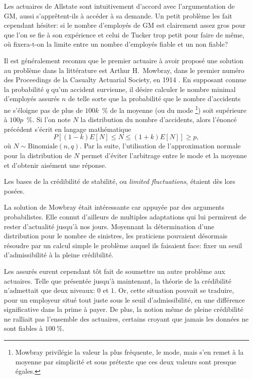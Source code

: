 Les actuaires de Allstate sont intuitivement d'accord avec
l'argumentation de GM, aussi s'apprêtent-ils à accéder à sa demande.
Un petit problème les fait cependant hésiter: si le nombre d'employés
de GM est clairement assez gros pour que l'on se fie à son expérience
et celui de Tucker trop petit pour faire de même, où fixera-t-on la
limite entre un nombre d'employés fiable et un non fiable?

Il est généralement reconnu que le premier actuaire à avoir proposé
une solution au problème dans la littérature est Arthur H.\ Mowbray,
dans le premier numéro des Proceedings de la Casualty Actuarial
Society, en 1914 \citep{Mowbray:1914}. En supposant connue la
probabilité $q$ qu'un accident survienne, il désire calculer le nombre
minimal d'employés assurés $n$ de telle sorte que la probabilité que
le nombre d'accidents ne s'éloigne pas de plus de $100k$~\% de la
moyenne (ou du mode%
\footnote{Mowbray privilégie la valeur la plus fréquente, le mode,
  mais s'en remet à la moyenne par simplicité et sous prétexte que ces
  deux valeurs sont presque égales.}) %
soit supérieure à $100p$~\%. Si l'on note $N$ la distribution du
nombre d'accidents, alors l'énoncé précédent s'écrit en langage
mathématique
\begin{equation*}
  P \left[ (1 - k)E[N] \leq N \leq (1 + k)E[N] \right] \geq p,
\end{equation*}
où $N \sim \text{Binomiale}(n, q)$. Par la suite, l'utilisation de
l'approximation normale pour la distribution de $N$ permet d'éviter
l'arbitrage entre le mode et la moyenne et d'obtenir aisément une
réponse.

Les bases de la crédibilité de stabilité, ou \emph{limited
  fluctuations}, étaient dès lors posées.

La solution de Mowbray était intéressante car appuyée par des
arguments probabilistes. Elle connut d'ailleurs de multiples
adaptations qui lui permirent de rester d'actualité jusqu'à nos jours.
Moyennant la détermination d'une distribution pour le nombre de
sinistres, les praticiens pouvaient désormais résoudre par un calcul
simple le problème auquel ils faisaient face: fixer un seuil
d'admissibilité à la pleine crédibilité.

Les assurés eurent cependant tôt fait de soumettre un autre problème
aux actuaires. Telle que présentée jusqu'à maintenant, la théorie de
la crédibilité n'admettait que deux niveaux: $0$ et $1$. Or, cette
situation pouvait se traduire, pour un employeur situé tout juste sous
le seuil d'admissibilité, en une différence significative dans la
prime à payer. De plus, la notion même de pleine crédibilité ne
ralliait pas l'ensemble des actuaires, certains croyant que jamais les
données ne sont fiables à $100~\%$.

